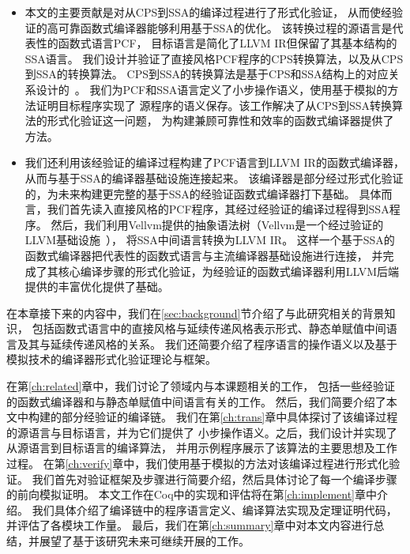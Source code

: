 \begin{itemize}
    \item
    本文的主要贡献是对从CPS到SSA的编译过程进行了形式化验证，
    从而使经验证的高可靠函数式编译器能够利用基于SSA的优化。
    该转换过程的源语言是代表性的函数式语言PCF，
    目标语言是简化了LLVM IR但保留了其基本结构的SSA语言。
    我们设计并验证了直接风格PCF程序的CPS转换算法，以及从CPS到SSA的转换算法。
    CPS到SSA的转换算法是基于CPS和SSA结构上的对应关系设计的~\cite{appel1998ssa,kelsey1995correspondence}。
    我们为PCF和SSA语言定义了小步操作语义，使用基于模拟的方法证明目标程序实现了
    源程序的语义保存。该工作解决了从CPS到SSA转换算法的形式化验证这一问题，
    为构建兼顾可靠性和效率的函数式编译器提供了方法。
    
    \item 
    我们还利用该经验证的编译过程构建了PCF语言到LLVM IR的函数式编译器，
    从而与基于SSA的编译器基础设施连接起来。
    该编译器是部分经过形式化验证的，为未来构建更完整的基于SSA的经验证函数式编译器打下基础。
    具体而言，我们首先读入直接风格的PCF程序，其经过经验证的编译过程得到SSA程序。
    然后，我们利用Vellvm提供的抽象语法树（Vellvm是一个经过验证的LLVM基础设施~\cite{vellvm2012,zakowski2021modular}），
    将SSA中间语言转换为LLVM IR。
    这样一个基于SSA的函数式编译器把代表性的函数式语言与主流编译器基础设施进行连接，
    并完成了其核心编译步骤的形式化验证，为经验证的函数式编译器利用LLVM后端提供的丰富优化提供了基础。
    
\end{itemize}

在本章接下来的内容中，我们在\ref{sec:background}节介绍了与此研究相关的背景知识，
包括函数式语言中的直接风格与延续传递风格表示形式、静态单赋值中间语言及其与延续传递风格的关系。
我们还简要介绍了程序语言的操作语义以及基于模拟技术的编译器形式化验证理论与框架。

在第\ref{ch:related}章中，我们讨论了领域内与本课题相关的工作，
包括一些经验证的函数式编译器和与静态单赋值中间语言有关的工作。
然后，我们简要介绍了本文中构建的部分经验证的编译链。
我们在第\ref{ch:trans}章中具体探讨了该编译过程的源语言与目标语言，并为它们提供了
小步操作语义。之后，我们设计并实现了从源语言到目标语言的编译算法，
并用示例程序展示了该算法的主要思想及工作过程。
在第\ref{ch:verify}章中，我们使用基于模拟的方法对该编译过程进行形式化验证。
我们首先对验证框架及步骤进行简要介绍，然后具体讨论了每一个编译步骤的前向模拟证明。
本文工作在Coq中的实现和评估将在第\ref{ch:implement}章中介绍。
我们具体介绍了编译链中的程序语言定义、编译算法实现及定理证明代码，并评估了各模块工作量。
最后，我们在第\ref{ch:summary}章中对本文内容进行总结，并展望了基于该研究未来可继续开展的工作。

